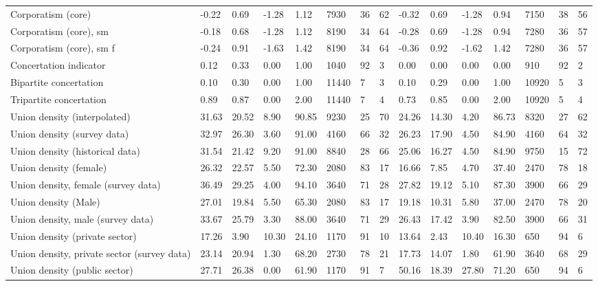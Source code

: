 \begin{longtable}{lllllllllllllll}
Corporatism (core) & -0.22 & 0.69 & -1.28 & 1.12 & 7930 & 36 & 62 & -0.32 & 0.69 & -1.28 & 0.94 & 7150 & 38 & 56\\
\addlinespace
Corporatism (core), sm & -0.18 & 0.68 & -1.28 & 1.12 & 8190 & 34 & 64 & -0.28 & 0.69 & -1.28 & 0.94 & 7280 & 36 & 57\\
Corporatism (core), sm f & -0.24 & 0.91 & -1.63 & 1.42 & 8190 & 34 & 64 & -0.36 & 0.92 & -1.62 & 1.42 & 7280 & 36 & 57\\
Concertation indicator & 0.12 & 0.33 & 0.00 & 1.00 & 1040 & 92 & 3 & 0.00 & 0.00 & 0.00 & 0.00 & 910 & 92 & 2\\
Bipartite concertation & 0.10 & 0.30 & 0.00 & 1.00 & 11440 & 7 & 3 & 0.10 & 0.29 & 0.00 & 1.00 & 10920 & 5 & 3\\
Tripartite concertation & 0.89 & 0.87 & 0.00 & 2.00 & 11440 & 7 & 4 & 0.73 & 0.85 & 0.00 & 2.00 & 10920 & 5 & 4\\
\addlinespace
Union density (interpolated) & 31.63 & 20.52 & 8.90 & 90.85 & 9230 & 25 & 70 & 24.26 & 14.30 & 4.20 & 86.73 & 8320 & 27 & 62\\
Union density (survey data) & 32.97 & 26.30 & 3.60 & 91.00 & 4160 & 66 & 32 & 26.23 & 17.90 & 4.50 & 84.90 & 4160 & 64 & 32\\
Union density (historical data) & 31.54 & 21.42 & 9.20 & 91.00 & 8840 & 28 & 66 & 25.06 & 16.27 & 4.50 & 84.90 & 9750 & 15 & 72\\
Union density (female) & 26.32 & 22.57 & 5.50 & 72.30 & 2080 & 83 & 17 & 16.66 & 7.85 & 4.70 & 37.40 & 2470 & 78 & 18\\
Union density, female (survey data) & 36.49 & 29.25 & 4.00 & 94.10 & 3640 & 71 & 28 & 27.82 & 19.12 & 5.10 & 87.30 & 3900 & 66 & 29\\
\addlinespace
Union density (Male) & 27.01 & 19.84 & 5.50 & 65.30 & 2080 & 83 & 17 & 19.18 & 10.31 & 5.80 & 37.00 & 2470 & 78 & 20\\
Union density, male (survey data) & 33.67 & 25.79 & 3.30 & 88.00 & 3640 & 71 & 29 & 26.43 & 17.42 & 3.90 & 82.50 & 3900 & 66 & 31\\
Union density (private sector) & 17.26 & 3.90 & 10.30 & 24.10 & 1170 & 91 & 10 & 13.64 & 2.43 & 10.40 & 16.30 & 650 & 94 & 6\\
Union density, private sector (survey data) & 23.14 & 20.94 & 1.30 & 68.20 & 2730 & 78 & 21 & 17.73 & 14.07 & 1.80 & 61.90 & 3640 & 68 & 29\\
Union density (public sector) & 27.71 & 26.38 & 0.00 & 61.90 & 1170 & 91 & 7 & 50.16 & 18.39 & 27.80 & 71.20 & 650 & 94 & 6\\

\end{longtable}
